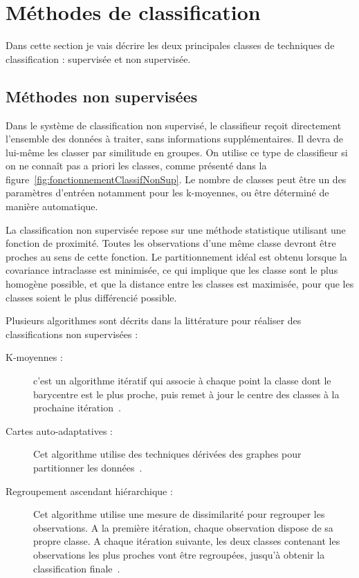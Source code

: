 	\section{Méthodes de classification}

Dans cette section je vais décrire les deux principales classes de techniques de classification : supervisée et non supervisée.

		\subsection{Méthodes non supervisées}

 Dans le système de classification non supervisé, le classifieur reçoit directement l'ensemble des données à traiter, sans informations supplémentaires. Il devra de lui-même les classer par similitude en groupes. On utilise ce type de classifieur si on ne connaît pas a priori les classes, comme présenté dans la figure~\ref{fig:fonctionnementClassifNonSup}. Le nombre de classes peut être un des paramètres d'entréen notamment pour les k-moyennes, ou être déterminé de manière automatique.


La classification non supervisée repose sur une méthode statistique utilisant une fonction de proximité. Toutes les observations d'une même classe devront être proches au sens de cette fonction. Le partitionnement idéal est obtenu lorsque la covariance intraclasse est minimisée, ce qui implique que les classe sont le plus homogène possible, et que la distance entre les classes est maximisée, pour que les classes soient le plus différencié possible.

Plusieurs algorithmes sont décrits dans la littérature pour réaliser des classifications non supervisées :

\begin{description}
 \item[K-moyennes : ] c'est un algorithme itératif qui associe à chaque point la classe dont le barycentre est le plus proche, puis remet à jour le centre des classes à la prochaine itération~\cite{herwig1999large}.
 \item[Cartes auto-adaptatives : ] Cet algorithme utilise des techniques dérivées des graphes pour partitionner les données~\cite{kohonen1982self}.
 \item[Regroupement ascendant hiérarchique : ] Cet algorithme utilise une mesure de dissimilarité pour regrouper les observations. A la première itération, chaque observation dispose de sa propre classe. A chaque itération suivante, les deux classes contenant les observations les plus proches vont être regroupées, jusqu'à obtenir la classification finale~\cite{ward1963hierarchical}.
\end{description}


